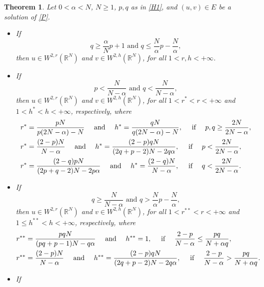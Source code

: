\documentclass[12pt,a4paper]{article}
\newtheorem{theorem}{Theorem}[section]
\numberwithin{equation}{section}
\begin{document}
\begin{theorem}\label{t10novo}
Let $0<\alpha< N$, $N\geq 1$, $p, q$ as in \eqref{H1}, and $(u, v)\in E$ be a solution of \eqref{P}. 
\begin{itemize}
    \item[(a)] If
    $$
    q \geq \dfrac{\alpha}{N}p + 1 \mbox{ \ \ \ and \ \ \ } q \leq \dfrac{N}{\alpha}p - \dfrac{N}{\alpha},
    $$
    then $u\in W^{2, r}(\mathbb{R}^N)$ and $v\in W^{2, h}(\mathbb{R}^N)$, for all $1< r, h <+\infty$.

    \item[(b)] If
    $$
    p < \dfrac{N}{N-\alpha} \mbox{\ \ \ and \ \ \ } q < \dfrac{N}{N-\alpha},
    $$
    then $u\in W^{2, r}(\mathbb{R}^N)$ and $v\in W^{2, h}(\mathbb{R}^N)$, for all $1< r^\ast < r <+\infty$ and $1< h^\ast< h< + \infty$, respectively, where
    \begin{align*}
    &r^\ast = \dfrac{pN}{p(2N-\alpha) -N} \mbox{ \ \ \ and \ \ \ } h^\ast = \dfrac{qN}{q(2N-\alpha) -N}, \mbox{ \ \ \ if \ \ \ } p,q\geq\frac{2N}{2N-\alpha},\vspace{10pt}\\
    &r^\ast = \dfrac{(2-p)N}{N- \alpha} \mbox{ \ \ \ and \ \ \ } h^\ast = \dfrac{(2-p)qN}{(2q+p-2)N - 2q\alpha}, \mbox{ \ \ \ if \ \ \ } p<\frac{2N}{2N-\alpha},\vspace{10pt}\\
    &r^\ast = \dfrac{(2-q)pN}{(2p+q-2)N - 2p\alpha} \mbox{ \ \ \ and \ \ \ } h^\ast = \dfrac{(2-q)N}{N- \alpha} , \mbox{ \ \ \ if \ \ \ } q<\frac{2N}{2N-\alpha}.
    \end{align*}
    \item[(c)] If
     $$
    q \geq \dfrac{N}{N-\alpha} \mbox{ \ \ \ and \ \ \ } q > \dfrac{N}{\alpha}p - \dfrac{N}{\alpha},
    $$
    then $u\in W^{2, r}(\mathbb{R}^N)$ and $v\in W^{2, h}(\mathbb{R}^N)$, for all $1< r^{\ast \ast} < r <+\infty$ and $1\leq h^{\ast \ast}< h<  + \infty$, respectively, where
     \begin{align*}
    &r^{\ast \ast} = \dfrac{pqN}{(pq+p-1)N-q\alpha} \mbox{ \ \ \ and \ \ \ } h^{\ast \ast} = 1, \mbox{ \ \ \ if \ \ \ } \dfrac{2-p}{N-\alpha} \leq \dfrac{pq}{N +\alpha q},\vspace{10pt}\\
    &r^{\ast \ast} = \dfrac{(2-p)N}{N- \alpha} \mbox{ \ \ \ and \ \ \ } h^{\ast \ast} = \dfrac{(2-p)qN}{(2q+p-2)N - 2q\alpha}, \mbox{ \ \ \ if \ \ \ } \dfrac{2-p}{N-\alpha} > \dfrac{pq}{N +\alpha q}.
    \end{align*}
    \item[(d)] If

\end{itemize}
\end{theorem}
\end{document}
